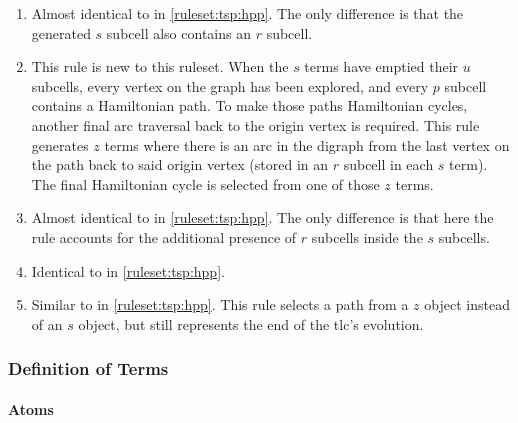 \begin{enumerate}
    \item Almost identical to  in \cref{ruleset:tsp:hpp}.  The only difference is that the generated \(s\) subcell also contains an \(r\) subcell.
    \item This rule is new to this \gls{ruleset}.  When the \(s\) terms have emptied their \(u\) subcells, every vertex on the graph has been explored, and every \(p\) subcell contains a Hamiltonian path.  To make those paths Hamiltonian cycles, another final arc traversal back to the origin vertex is required.  This rule generates \(z\) terms where there is an arc in the digraph from the last vertex on the path back to said origin vertex (stored in an \(r\) subcell in each \(s\) term).  The final Hamiltonian cycle is selected from one of those \(z\) terms.
    \item Almost identical to  in \cref{ruleset:tsp:hpp}.  The only difference is that here the rule accounts for the additional presence of \(r\) subcells inside the \(s\) subcells.
    \item Identical to  in \cref{ruleset:tsp:hpp}.
    \item Similar to  in \cref{ruleset:tsp:hpp}.  This rule selects a path from a \(z\) object instead of an \(s\) object, but still represents the end of the \gls{tlc}'s evolution.
\end{enumerate}

\subsubsection{Definition of Terms}

\paragraph{Atoms}
\begin{description}
\end{description}

